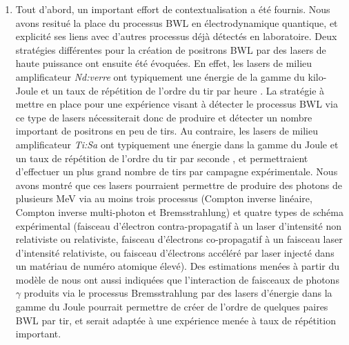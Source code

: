 \begin{refsection}
\begin{enumerate}
    \item Tout d'abord, un important effort de contextualisation a été fournis. 
    Nous avons resitué la place du processus BWL en électrodynamique quantique, et explicité ses liens avec d'autres processus déjà détectés en laboratoire. 
    Deux stratégies différentes pour la création de positrons BWL par des lasers de haute puissance ont ensuite été évoquées. En effet, les lasers de milieu amplificateur \textit{Nd:verre} ont typiquement une énergie de la gamme du kilo-Joule et un taux de répétition de l'ordre du tir par heure \parencite{danson_2019}. La stratégie à mettre en place pour une expérience visant à détecter le processus BWL via ce type de lasers nécessiterait donc de produire et détecter un nombre important de positrons en peu de tirs. Au contraire, les lasers de milieu amplificateur \textit{Ti:Sa} ont typiquement une énergie dans la gamme du Joule et un taux de répétition de l'ordre du tir par seconde \parencite{danson_2019}, et permettraient d'effectuer un plus grand nombre de tirs par campagne expérimentale.
    Nous avons montré que ces lasers pourraient permettre de produire des photons de plusieurs MeV via au moins trois processus (Compton inverse linéaire, Compton inverse multi-photon et Bremsstrahlung) et quatre types de schéma expérimental (faisceau d'électron contra-propagatif à un laser d'intensité non relativiste ou relativiste, faisceau d'électrons co-propagatif à un faisceau laser d'intensité relativiste, ou faisceau d'électrons accéléré par laser injecté dans un matériau de numéro atomique élevé). 
    Des estimations menées à partir du modèle de \cite{ribeyre_2016} nous ont aussi indiquées que l'interaction de faisceaux de photons $\gamma$ produits via le processus Bremsstrahlung par des lasers d'énergie dans la gamme du Joule pourrait permettre de créer de l'ordre de quelques paires BWL par tir, et serait adaptée à une expérience menée à taux de répétition important.


\end{enumerate}
\end{refsection}

